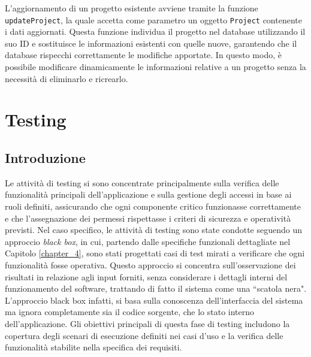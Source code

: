 \documentclass[target=bach,aauheader=,style=]{thud}
\begin{document}
\noindent L'aggiornamento di un progetto esistente avviene tramite la funzione \texttt{updateProject}, la quale accetta come parametro un oggetto \texttt{Project} contenente i dati aggiornati. Questa funzione individua il progetto nel database utilizzando il suo ID e sostituisce le informazioni esistenti con quelle nuove, garantendo che il database rispecchi correttamente le modifiche apportate. In questo modo, è possibile modificare dinamicamente le informazioni relative a un progetto senza la necessità di eliminarlo e ricrearlo.



\chapter{Testing}\label{chapter_5}

\section{Introduzione}
Le attività di testing si sono concentrate principalmente sulla verifica delle funzionalità principali dell'applicazione e sulla gestione degli accessi in base ai ruoli definiti, assicurando che ogni componente critico funzionasse correttamente e che l'assegnazione dei permessi rispettasse i criteri di sicurezza e operatività previsti. Nel caso specifico, le attività di testing sono state condotte seguendo un approccio \textit{black box}, in cui, partendo dalle specifiche funzionali dettagliate nel Capitolo \ref{chapter_4}, sono stati progettati casi di test mirati a verificare che ogni funzionalità fosse operativa. Questo approccio si concentra sull'osservazione dei risultati in relazione agli input forniti, senza considerare i dettagli interni del funzionamento del software, trattando di fatto il sistema come una ``scatola nera". L'approccio black box infatti, si basa sulla conoscenza dell'interfaccia del sistema ma ignora completamente sia il codice sorgente, che lo stato interno dell'applicazione. Gli obiettivi principali di questa fase di testing includono la copertura degli scenari di esecuzione definiti nei casi d'uso e la verifica delle funzionalità stabilite nella specifica dei requisiti.
\end{document}
